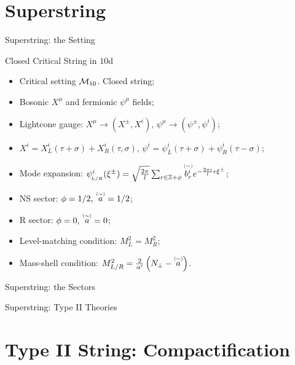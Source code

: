 \section{Superstring}
\begin{frame}{Superstring: the Setting}
	\begin{block}{Closed Critical String in \texorpdfstring{$10$}{10}d}
		\begin{itemize}
			\item Critical setting $\mathcal{M}_{10}$. Closed string;
			\item Bosonic $X^\mu$ and fermionic $\psi^\mu$ fields; \pause
			\item Lightcone gauge: $X^\mu \to (X^\pm, X^i), \, \psi^\mu \to (\psi^\pm, \psi^i)$;
			\item $X^i = X^i_L (\tau + \sigma) + X^i_R (\tau,\sigma), \, \psi^i = \psi^i_L(\tau+\sigma)+\psi^i_R(\tau-\sigma)$; \pause
			\item Mode expansion: $\psi^i_{\!_{L/R}} (\xi^\pm) = \sqrt{\frac{2\pi}{l}} \sum_{r \in \mathbb{Z} + \phi} \mathord{\mathop{b^i_r}\limits^{\scriptscriptstyle(\sim)}} e ^{-\frac{2\pi i}{l} r \xi^\pm} $; \pause
			\item NS sector: $\phi = 1/2, \, \mathord{\mathop{a}\limits^{\scriptscriptstyle(\sim)}} = 1/2$;
			\item R sector: $\phi = 0, \, \mathord{\mathop{a}\limits^{\scriptscriptstyle(\sim)}} = 0$; \pause
			\item Level-matching condition: $M^2_L = M^2_R$;
			\item Mass-shell condition: $M^2_{L/R} = \frac{2}{\alpha'} \left({N}_\perp - \mathord{\mathop{a}\limits^{\scriptscriptstyle(\sim)}} \right)$.
		\end{itemize}
	\end{block}
\end{frame}

\begin{frame}{Superstring: the Sectors}
	\begin{table}[c]
		\scalebox{0.77}{
			
		}
	\end{table}
\end{frame}

\begin{frame}{Superstring: Type II Theories}
	\begin{table}[c]
		\scalebox{0.78}{
			
		}
	\end{table}
\end{frame}

\section{Type II String: Compactification}

